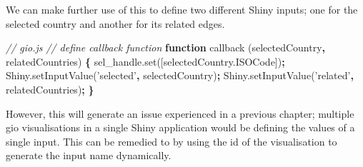 \documentclass[10pt,]{krantz}
\makeatletter
\newenvironment{Shaded}{\begin{snugshade}}{\end{snugshade}}
\newcommand{\AttributeTok}[1]{\textcolor[rgb]{0.61,0.61,0.61}{#1}}
\newcommand{\CommentTok}[1]{\textcolor[rgb]{0.37,0.37,0.37}{\textit{#1}}}
\newcommand{\KeywordTok}[1]{\textcolor[rgb]{0.27,0.27,0.27}{\textbf{#1}}}
\newcommand{\NormalTok}[1]{#1}
\newcommand{\OperatorTok}[1]{\textcolor[rgb]{0.43,0.43,0.43}{\textbf{#1}}}
\newcommand{\StringTok}[1]{\textcolor[rgb]{0.5,0.5,0.5}{#1}}
\newcommand{\VariableTok}[1]{\textcolor[rgb]{0,0,0}{#1}}
\newenvironment{kframe}{%
\medskip{}
\setlength{\fboxsep}{.8em}
 \def\at@end@of@kframe{}%
 \ifinner\ifhmode%
  \def\at@end@of@kframe{\end{minipage}}%
  \begin{minipage}{\columnwidth}%
 \fi\fi%
 \def\FrameCommand##1{\hskip\@totalleftmargin \hskip-\fboxsep
 \colorbox{shadecolor}{##1}\hskip-\fboxsep
     \hskip-\linewidth \hskip-\@totalleftmargin \hskip\columnwidth}%
 \MakeFramed {\advance\hsize-\width
   \@totalleftmargin\z@ \linewidth\hsize
   \@setminipage}}%
 {\par\unskip\endMakeFramed%
 \at@end@of@kframe}
\renewenvironment{Shaded}{\begin{kframe}}{\end{kframe}}
\makeatother
\begin{document}
We can make further use of this to define two different Shiny inputs; one for the selected country and another for its related edges.

\begin{Shaded}
\begin{Highlighting}[]
\CommentTok{// gio.js}
\CommentTok{// define callback function}
\KeywordTok{function} \AttributeTok{callback}\NormalTok{ (selectedCountry}\OperatorTok{,}\NormalTok{ relatedCountries) }\OperatorTok{\{}
  \VariableTok{sel_handle}\NormalTok{.}\AttributeTok{set}\NormalTok{([}\VariableTok{selectedCountry}\NormalTok{.}\AttributeTok{ISOCode}\NormalTok{])}\OperatorTok{;}
  \VariableTok{Shiny}\NormalTok{.}\AttributeTok{setInputValue}\NormalTok{(}\StringTok{'selected'}\OperatorTok{,}\NormalTok{ selectedCountry)}\OperatorTok{;}
  \VariableTok{Shiny}\NormalTok{.}\AttributeTok{setInputValue}\NormalTok{(}\StringTok{'related'}\OperatorTok{,}\NormalTok{ relatedCountries)}\OperatorTok{;}
\OperatorTok{\}}
\end{Highlighting}
\end{Shaded}

However, this will generate an issue experienced in a previous chapter; multiple gio visualisations in a single Shiny application would be defining the values of a single input. This can be remedied to by using the id of the visualisation to generate the input name dynamically.
\end{document}
